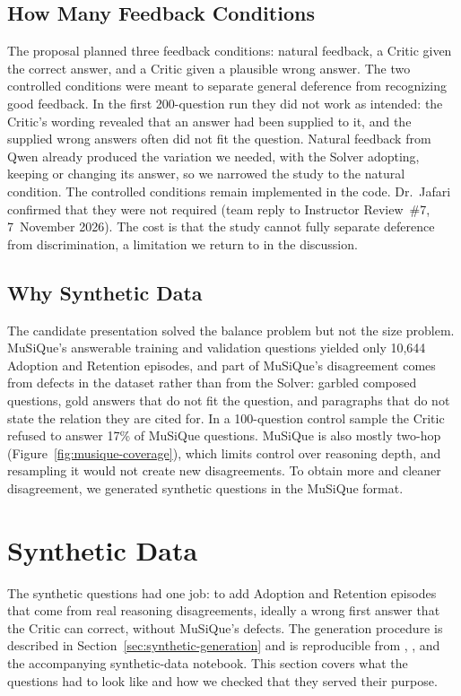 \subsection{How Many Feedback Conditions}

The proposal planned three feedback conditions: natural feedback, a Critic
given the correct answer, and a Critic given a plausible wrong answer. The two
controlled conditions were meant to separate general deference from
recognizing good feedback. In the first 200-question run they did not work as
intended: the Critic's wording revealed that an answer had been supplied to
it, and the supplied wrong answers often did not fit the question. Natural
feedback from Qwen already produced the variation we needed, with the Solver
adopting, keeping or changing its answer, so we narrowed the study to the
natural condition. The controlled conditions remain implemented in the code.
Dr.~Jafari confirmed that they were not required (team reply to Instructor
Review~\#7, 7~November 2026). The cost is that the study cannot fully separate
deference from discrimination, a limitation we return to in the discussion.

\subsection{Why Synthetic Data}

The candidate presentation solved the balance problem but not the size
problem. MuSiQue's answerable training and validation questions yielded only
10,644 Adoption and Retention episodes, and part of MuSiQue's disagreement
comes from defects in the dataset rather than from the Solver: garbled
composed questions, gold answers that do not fit the question, and paragraphs
that do not state the relation they are cited for. In a 100-question control
sample the Critic refused to answer 17\% of MuSiQue questions. MuSiQue is also
mostly two-hop (Figure~\ref{fig:musique-coverage}), which limits control over
reasoning depth, and resampling it would not create new disagreements. To
obtain more and cleaner disagreement, we generated synthetic questions in the
MuSiQue format.

\section{Synthetic Data}
\label{sec:synthetic-data}

The synthetic questions had one job: to add Adoption and Retention episodes
that come from real reasoning disagreements, ideally a wrong first answer that
the Critic can correct, without MuSiQue's defects. The generation procedure is
described in Section~\ref{sec:synthetic-generation} and is reproducible from
,
, and the accompanying synthetic-data
notebook. This section covers what the questions had to look like and how we
checked that they served their purpose.

